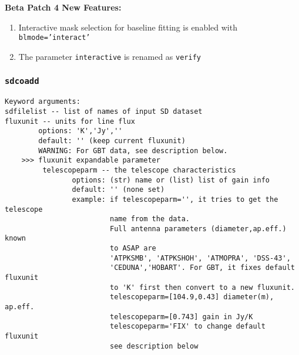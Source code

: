     {\bf Beta Patch 4 New Features:}
    \begin{enumerate}
    \item Interactive mask selection for baseline fitting is enabled
with {\tt blmode='interact'}
    \item The parameter {\tt interactive} is renamed as {\tt verify} 
    \end{enumerate}

\subsubsection{{\tt sdcoadd}}
\label{section:sd.sdtasks.tasks.sdcoadd}

\begin{verbatim}
Keyword arguments:
sdfilelist -- list of names of input SD dataset
fluxunit -- units for line flux
        options: 'K','Jy',''
        default: '' (keep current fluxunit)
        WARNING: For GBT data, see description below.
    >>> fluxunit expandable parameter
         telescopeparm -- the telescope characteristics
                options: (str) name or (list) list of gain info
                default: '' (none set)
                example: if telescopeparm='', it tries to get the telescope
                         name from the data.
                         Full antenna parameters (diameter,ap.eff.) known
                         to ASAP are
                         'ATPKSMB', 'ATPKSHOH', 'ATMOPRA', 'DSS-43',
                         'CEDUNA','HOBART'. For GBT, it fixes default fluxunit
                         to 'K' first then convert to a new fluxunit.
                         telescopeparm=[104.9,0.43] diameter(m), ap.eff.
                         telescopeparm=[0.743] gain in Jy/K
                         telescopeparm='FIX' to change default fluxunit
                         see description below


\end{verbatim}

